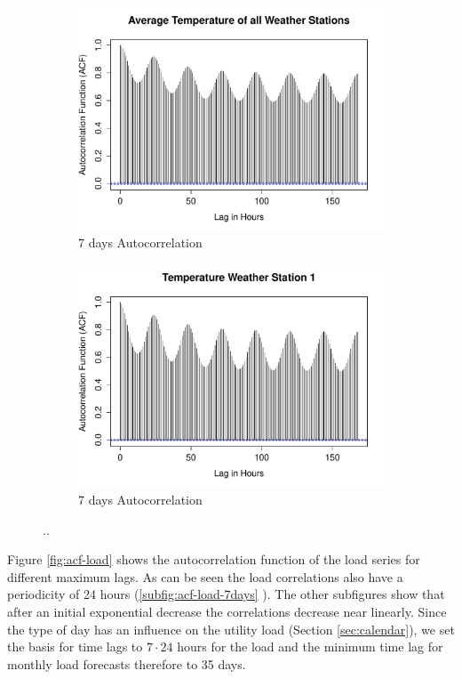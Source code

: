 \documentclass[conference]{IEEEtran}
\begin{document}
\begin{figure}[!ht]
\centering
\begin{subfigure}[b]{.49\linewidth}
\includegraphics[width=\linewidth]{gfx/acf_avg_temp_7days.pdf}
\caption{7 days Autocorrelation}
\label{subfig:avg-temp-7days}
\end{subfigure}
\begin{subfigure}[b]{.49\linewidth}
\includegraphics[width=\linewidth]{gfx/acf_temp_station1_7days.pdf}
\caption{7 days Autocorrelation}
\label{subfig:temp-station1-7days}
\end{subfigure}
\caption{..}
\label{fig:temp-lags}
\end{figure}

Figure \ref{fig:acf-load} shows the autocorrelation function of the load series for different maximum lags. As can be seen the load correlations also have a periodicity of 24 hours (\ref{subfig:acf-load-7days} ). The other subfigures show that after an initial exponential decrease the correlations decrease near linearly. Since the type of day has an influence on the utility load (Section \ref{sec:calendar}), we set the basis for time lags to $7\cdot24$ hours for the load and the minimum time lag for monthly load forecasts therefore to 35 days.
\end{document}
